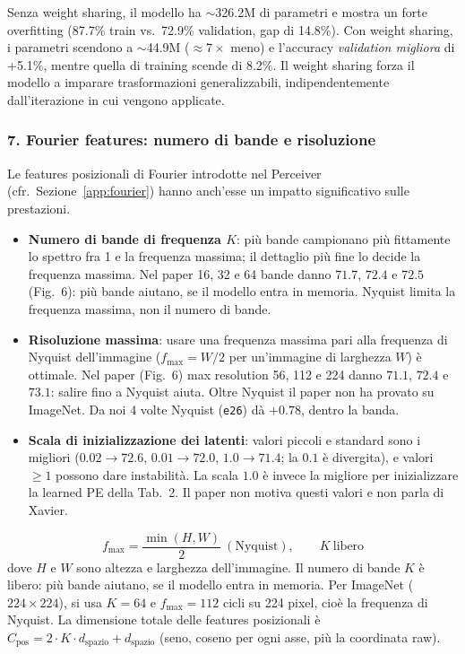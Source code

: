 \documentclass[
  11pt,
]{article}
\begin{document}
\begin{notabox}[title={\textbf{Weight sharing come regolarizzatore}}]
Senza weight sharing, il modello ha $\sim$326.2M di parametri e mostra un forte overfitting (87.7\% train vs.\ 72.9\% validation, gap di 14.8\%). Con weight sharing, i parametri scendono a $\sim$44.9M ($\approx 7\times$ meno) e l'accuracy \emph{validation migliora} di +5.1\%, mentre quella di training scende di 8.2\%. Il weight sharing forza il modello a imparare trasformazioni generalizzabili, indipendentemente dall'iterazione in cui vengono applicate.
\end{notabox}

\subsubsection*{7. Fourier features: numero di bande e risoluzione}

Le features posizionali di Fourier introdotte nel Perceiver (cfr.\ Sezione~\ref{app:fourier}) hanno anch'esse un impatto significativo sulle prestazioni.

\begin{itemize}
  \item \textbf{Numero di bande di frequenza $K$}: più bande campionano più fittamente lo spettro fra 1 e la frequenza massima; il dettaglio più fine lo decide la frequenza massima. Nel paper 16, 32 e 64 bande danno $71.7$, $72.4$ e $72.5$ (Fig.~6): più bande aiutano, se il modello entra in memoria. Nyquist limita la frequenza massima, non il numero di bande.
  \item \textbf{Risoluzione massima}: usare una frequenza massima pari alla frequenza di Nyquist dell'immagine ($f_{\max} = W/2$ per un'immagine di larghezza $W$) è ottimale. Nel paper (Fig.~6) max resolution 56, 112 e 224 danno $71.1$, $72.4$ e $73.1$: salire fino a Nyquist aiuta. Oltre Nyquist il paper non ha provato su ImageNet. Da noi 4 volte Nyquist (\texttt{e26}) dà $+0.78$, dentro la banda.
  \item \textbf{Scala di inizializzazione dei latenti}: valori piccoli e standard sono i migliori ($0.02 \to 72.6$, $0.01 \to 72.0$, $1.0 \to 71.4$; la $0.1$ è divergita), e valori $\ge 1$ possono dare instabilità. La scala $1.0$ è invece la migliore per inizializzare la learned PE della Tab.~2. Il paper non motiva questi valori e non parla di Xavier.
\end{itemize}

\begin{formulabox}[title={\textbf{Regola pratica per le Fourier features}}]
\[
f_{\max} = \frac{\min(H, W)}{2}\ (\text{Nyquist}), \qquad K\ \text{libero}
\]
dove $H$ e $W$ sono altezza e larghezza dell'immagine. Il numero di bande $K$ è libero: più bande aiutano, se il modello entra in memoria. Per ImageNet ($224 \times 224$), si usa $K = 64$ e $f_{\max} = 112$ cicli su 224 pixel, cioè la frequenza di Nyquist. La dimensione totale delle features posizionali è $C_{\text{pos}} = 2 \cdot K \cdot d_{\text{spazio}} + d_{\text{spazio}}$ (seno, coseno per ogni asse, più la coordinata raw).
\end{formulabox}
\end{document}
